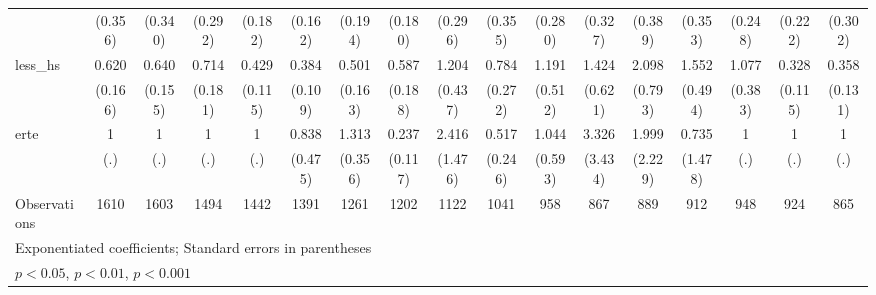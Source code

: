 {\begin{tabular}{l*{16}{c}}
                    &     (0.356)         &     (0.340)         &     (0.292)         &     (0.182)         &     (0.162)         &     (0.194)         &     (0.180)         &     (0.296)         &     (0.355)         &     (0.280)         &     (0.327)         &     (0.389)         &     (0.353)         &     (0.248)         &     (0.222)         &     (0.302)         \\
[1em]
less\_hs             &       0.620         &       0.640         &       0.714         &       0.429\sym{**} &       0.384\sym{***}&       0.501\sym{*}  &       0.587         &       1.204         &       0.784         &       1.191         &       1.424         &       2.098\sym{*}  &       1.552         &       1.077         &       0.328\sym{**} &       0.358\sym{**} \\
                    &     (0.166)         &     (0.155)         &     (0.181)         &     (0.115)         &     (0.109)         &     (0.163)         &     (0.188)         &     (0.437)         &     (0.272)         &     (0.512)         &     (0.621)         &     (0.793)         &     (0.494)         &     (0.383)         &     (0.115)         &     (0.131)         \\
[1em]
erte                &           1         &           1         &           1         &           1         &       0.838         &       1.313         &       0.237\sym{**} &       2.416         &       0.517         &       1.044         &       3.326         &       1.999         &       0.735         &           1         &           1         &           1         \\
                    &         (.)         &         (.)         &         (.)         &         (.)         &     (0.475)         &     (0.356)         &     (0.117)         &     (1.476)         &     (0.246)         &     (0.593)         &     (3.434)         &     (2.229)         &     (1.478)         &         (.)         &         (.)         &         (.)         \\
\hline
Observations        &        1610         &        1603         &        1494         &        1442         &        1391         &        1261         &        1202         &        1122         &        1041         &         958         &         867         &         889         &         912         &         948         &         924         &         865         \\
\hline\hline
\multicolumn{17}{l}{\footnotesize Exponentiated coefficients; Standard errors in parentheses}\\
\multicolumn{17}{l}{\footnotesize \sym{*} \(p<0.05\), \sym{**} \(p<0.01\), \sym{***} \(p<0.001\)}\\
\end{tabular}
}
